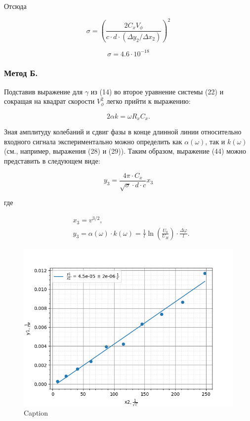 \documentclass[a4paper,12 pt]{article}
\begin{document}
Отсюда

\begin{equation*}
\sigma=\left(\frac{2 C_{x} V_{\phi}}{c \cdot d \cdot\left(\Delta y_{2} / \Delta x_{2}\right)}\right)^{2} \tag{43}
\end{equation*}

\[\sigma = 4.6\cdot 10^{-18}\]


\subsubsection{Метод Б.}

Подставив выражение для $\gamma$ из (14) во второе уравнение системы (22) и сокращая на квадрат скорости $V_{\phi}^{2}$ легко прийти к выражению:


\begin{equation*}
2 \alpha k=\omega R_{x} C_{x} . \tag{44}
\end{equation*}


Зная амплитуду колебаний и сдвиг фазы в конце длинной линии относительно входного сигнала экспериментально можно определить как $\alpha(\omega)$, так и $k(\omega)$ (см., например, выражения (28) и (29)). Таким образом, выражение (44) можно представить в следующем виде:


\begin{equation*}
y_{3}=\frac{4 \pi \cdot C_{x}}{\sqrt{\sigma} \cdot d \cdot c} x_{3} \tag{45}
\end{equation*}


где


\begin{align*}
& x_{3}=v^{3 / 2},  \tag{46}\\
& y_{3}=\alpha(\omega) \cdot k(\omega)=\frac{1}{l} \ln \left(\frac{U_{0}}{U_{H}}\right) \cdot \frac{\Delta \varphi}{l} . \tag{47}
\end{align*}

\begin{figure}[H]
    \centering
    \includegraphics[scale=0.7]{y3(x3).png}
    \caption{Caption}
    \label{fig:enter-label}
\end{figure}
\end{document}
